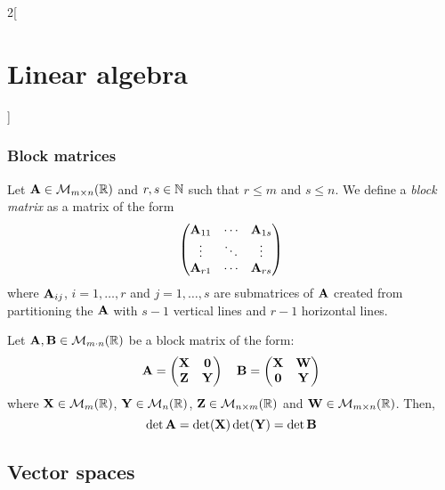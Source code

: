 \documentclass[../../../main.tex]{subfiles}
\begin{document}
\begin{multicols}{2}[\section{Linear algebra}]
  \subsubsection{Block matrices}
  \begin{definition}
    Let $\boldsymbol{\mathrm{A}}\in\mathcal{M}_{m\times n}(\mathbb{R})$ and $r,s\in\mathbb{N}$ such that $r\leq m$ and $s\leq n$. We define a \emph{block matrix} as a matrix of the form
    $$
      \begin{pmatrix}
        \boldsymbol{\mathrm{A}}_{11} & \cdots & \boldsymbol{\mathrm{A}}_{1s} \\
        \vdots                  & \ddots & \vdots                  \\
        \boldsymbol{\mathrm{A}}_{r1} & \cdots & \boldsymbol{\mathrm{A}}_{rs}
      \end{pmatrix}
    $$
    where $\boldsymbol{\mathrm{A}}_{ij}$, $i=1,\ldots,r$ and $j=1,\ldots,s$ are submatrices of $\boldsymbol{\mathrm{A}}$ created from partitioning the $\boldsymbol{\mathrm{A}}$ with $s-1$ vertical lines and $r-1$ horizontal lines.
  \end{definition}
  \begin{prop}
    Let $\boldsymbol{\mathrm{A}},\boldsymbol{\mathrm{B}}\in\mathcal{M}_{m\cdot n}(\mathbb{R})$ be a block matrix of the form:
    $$\boldsymbol{\mathrm{A}}=
      \begin{pmatrix}
        \boldsymbol{\mathrm{X}} & \boldsymbol{\mathrm{0}} \\
        \boldsymbol{\mathrm{Z}} & \boldsymbol{\mathrm{Y}}
      \end{pmatrix}\quad
      \boldsymbol{\mathrm{B}}=
      \begin{pmatrix}
        \boldsymbol{\mathrm{X}} & \boldsymbol{\mathrm{W}} \\
        \boldsymbol{\mathrm{0}} & \boldsymbol{\mathrm{Y}}
      \end{pmatrix}
    $$
    where $\boldsymbol{\mathrm{X}}\in\mathcal{M}_m(\mathbb{R})$, $\boldsymbol{\mathrm{Y}}\in\mathcal{M}_n(\mathbb{R})$, $\boldsymbol{\mathrm{Z}}\in\mathcal{M}_{n\times m}(\mathbb{R})$ and $\boldsymbol{\mathrm{W}}\in\mathcal{M}_{m\times n}(\mathbb{R})$. Then, $$\det\boldsymbol{\mathrm{A}}=\det(\boldsymbol{\mathrm{X}})\det(\boldsymbol{\mathrm{Y}})=\det\boldsymbol{\mathrm{B}}$$
  \end{prop}
  \subsection{Vector spaces}

\end{multicols}
\end{document}
